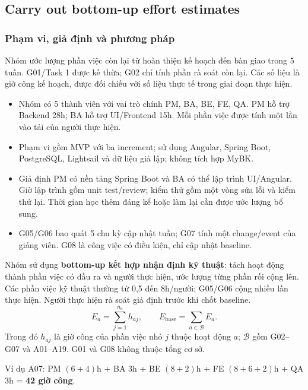 \clearpage
{}
\subsection{Carry out bottom-up effort estimates}
\subsubsection{Phạm vi, giả định và phương pháp}
Nhóm ước lượng phần việc còn lại từ hoàn thiện kế hoạch đến bàn giao trong 5 tuần. G01/Task 1 được kế thừa; G02 chỉ tính phần rà soát còn lại. Các số liệu là giờ công kế hoạch, được đối chiếu với số liệu thực tế trong giai đoạn thực hiện.
\begin{itemize}[leftmargin=*,nosep]
\item Nhóm có 5 thành viên với vai trò chính PM, BA, BE, FE, QA. PM hỗ trợ Backend 28h; BA hỗ trợ UI/Frontend 15h. Mỗi phần việc được tính một lần vào tải của người thực hiện.
\item Phạm vi gồm MVP với ba increment; sử dụng Angular, Spring Boot, PostgreSQL, Lightsail và dữ liệu giả lập; không tích hợp MyBK.
\item Giả định PM có nền tảng Spring Boot và BA có thể lập trình UI/Angular. Giờ lập trình gồm unit test/review; kiểm thử gồm một vòng sửa lỗi và kiểm thử lại. Thời gian học thêm đáng kể hoặc làm lại cần được ước lượng bổ sung.
\item G05/G06 bao quát 5 chu kỳ cập nhật tuần; G07 tính một change/event của giảng viên. G08 là công việc có điều kiện, chỉ cập nhật baseline.
\end{itemize}

Nhóm sử dụng \textbf{bottom-up kết hợp nhận định kỹ thuật}: tách hoạt động thành phần việc có đầu ra và người thực hiện, ước lượng từng phần rồi cộng lên. Các phần việc kỹ thuật thường từ 0,5 đến 8h/người; G05/G06 cộng nhiều lần thực hiện. Người thực hiện rà soát giả định trước khi chốt baseline.
\[
E_{a}=\sum_{j=1}^{n_a}h_{aj},\qquad
E_{\mathrm{base}}=\sum_{a\in\mathcal B}E_a.
\]
Trong đó $h_{aj}$ là giờ công của phần việc nhỏ $j$ thuộc hoạt động $a$; $\mathcal B$ gồm G02--G07 và A01--A19. G01 và G08 không thuộc tổng cơ sở.

Ví dụ A07: PM $(6+4)$h + BA 3h + BE $(8+2)$h + FE $(8+6+2)$h + QA 3h = \textbf{42 giờ công}.

